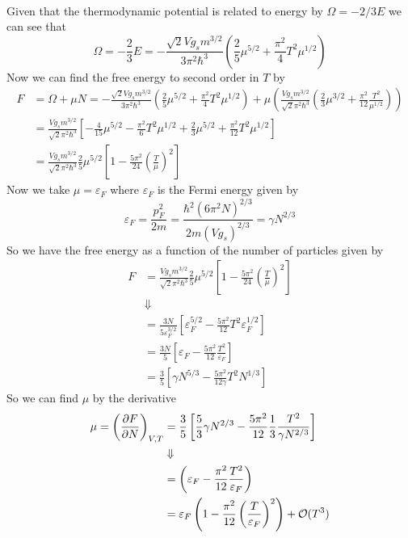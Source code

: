 \documentclass[11pt]{article}
\numberwithin{equation}{section}
\begin{document}
\begin{enumerate}[(1)]
\begin{align*}
\end{align*}
Given that the thermodynamic potential is related to energy by $\Omega=-2/3E$ we can see that
$$\Omega = -\frac{2}{3}E =  -\frac{\sqrt{2}Vg_sm^{3/2}}{3\pi^2\hbar^3}\left(\frac{2}{5}\mu^{5/2}+\frac{\pi^2}{4}T^2\mu^{1/2}\right)$$
Now we can find the free energy to second order in $T$ by
\begin{align*}
F &= \Omega + \mu{N} = -\frac{\sqrt{2}Vg_sm^{3/2}}{3\pi^2\hbar^3}\left(\frac{2}{5}\mu^{5/2}+\frac{\pi^2}{4}T^2\mu^{1/2}\right) +\mu\left(\frac{Vg_sm^{3/2}}{\sqrt{2}\pi^2\hbar^3}\left(\frac{2}{3}\mu^{3/2}+\frac{\pi^2}{12}\frac{T^2}{\mu^{1/2}}\right)\right)\\
&= \frac{Vg_sm^{3/2}}{\sqrt{2}\pi^2\hbar^3}\left[-\frac{4}{15}\mu^{5/2}-\frac{\pi^2}{6}T^2\mu^{1/2}+\frac{2}{3}\mu^{5/2}+\frac{\pi^2}{12}T^2\mu^{1/2}\right]\\
&= \frac{Vg_sm^{3/2}}{\sqrt{2}\pi^2\hbar^3}\frac{2}{5}\mu^{5/2}\left[1 - \frac{5\pi^2}{24}\left(\frac{T}{\mu}\right)^2\right]
\end{align*}
Now we take $\mu=\varepsilon_F$ where $\varepsilon_F$ is the Fermi energy given by
$$\varepsilon_F = \frac{p_F^2}{2m} = \frac{\hbar^2(6\pi^2N)^{2/3}}{2m(Vg_s)^{2/3}} = \gamma{N^{2/3}}$$
So we have the free energy as a function of the number of particles given by
\begin{align*}
F &= \frac{Vg_sm^{3/2}}{\sqrt{2}\pi^2\hbar^3}\frac{2}{5}\mu^{5/2}\left[1 - \frac{5\pi^2}{24}\left(\frac{T}{\mu}\right)^2\right]\\
&\Downarrow\\
&= \frac{3N}{5\varepsilon_F^{3/2}}\left[\varepsilon_F^{5/2} - \frac{5\pi^2}{12}T^2\varepsilon_F^{1/2}\right]\\
&= \frac{3N}{5}\left[\varepsilon_F - \frac{5\pi^2}{12}\frac{T^2}{\varepsilon_F}\right]\\
&= \frac{3}{5}\left[\gamma{N^{5/3}} - \frac{5\pi^2}{12\gamma}T^2N^{1/3}\right]
\end{align*}
So we can find $\mu$ by the derivative
\begin{align*}
\mu = \left(\frac{\partial{F}}{\partial{N}}\right)_{V,T} &= \frac{3}{5}\left[\frac{5}{3}\gamma{N^{2/3}} - \frac{5\pi^2}{12}\frac{1}{3}\frac{T^2}{\gamma{N^{2/3}}}\right]\\
&\Downarrow\\
&= \left(\varepsilon_F - \frac{\pi^2}{12}\frac{T^2}{\varepsilon_F}\right)\\
&= \varepsilon_F\left(1 - \frac{\pi^2}{12}\left(\frac{T}{\varepsilon_F}\right)^2\right) + \mathcal{O}(T^3)
\end{align*}


\end{enumerate}
\end{document}
